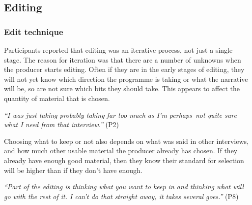 \subsection{Editing}

\subsubsection{Edit technique}


Participants reported that editing was an iterative process, not just a single stage.
The reason for iteration was that there are a number of unknowns when the producer starts editing.
Often if they are in the early stages of editing, they will not yet know which direction the programme is taking or
what the narrative will be, so are not sure which bits they should take.  This appears to affect the quantity of
material that is chosen.

\textit{``I was just taking probably taking far too much as I'm perhaps not quite sure what I need from that
interview.''} (P2)



Choosing what to keep or not also depends on what was said in other interviews, and how much other usable material the
producer already has chosen. If they already have enough good material, then they know their standard for selection
will be higher than if they don't have enough.

\textit{``Part of the editing is thinking what you want to keep in and thinking what will go with the rest of it. I
can't do that straight away, it takes several goes.''} (P8)

